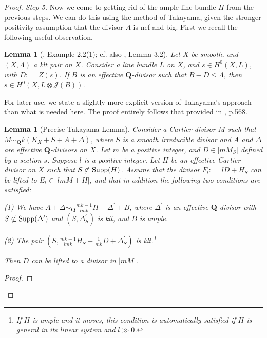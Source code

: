 \documentclass[11pt]{amsart}
\theoremstyle{plain}
\newtheorem{lemma}[theorem]{Lemma}
\theoremstyle{definition}
\newcommand{\noi}{\noindent}
\newcommand{\QQ}{\mathbf{Q}}
\newcommand{\JJ}{\mathcal  {J}}
\begin{document}
\begin{proof}
\noindent
\emph{Step 5.}
Now we come to getting rid of the ample line bundle $H$ from the previous steps. We can do this using the method of Takayama, given the stronger positivity assumption that the divisor $A$ is nef and big. First we recall the following useful observation.

\begin{lemma}[\cite{takayama}, Example 2.2(1); cf. also \cite{hm2}, Lemma 3.2]\label{local_inclusion}
Let $X$ be smooth, and $(X, \Lambda)$ a klt pair on $X$. Consider a line bundle $L$ on $X$, and $s \in H^0 (X, L)$, with $D : = Z(s)$. If $B$ is an effective $\QQ$-divisor  such that $B - D \leq \Lambda$, 
then $s \in H^0 (X, L \otimes \JJ(B))$. 
\end{lemma}

\noindent
For later use, we state a slightly more explicit version of Takayama's approach than what  is needed here. The proof entirely follows that provided in \cite{takayama}, p.568.

\begin{lemma}[Precise Takayama Lemma]\label{precise_takayama}
Consider a Cartier divisor $M$ such that $M \sim_{\QQ} k (K_X + S + A + \Delta)$, where $S$ 
is a smooth irreducible divisor and $A$ and $\Delta$ are effective $\QQ$-divisors on $X$.
Let $m$ be a positive integer, and $D\in |mM_S|$ defined by a section $s$.
Suppose $l$ is a positive integer. Let $H$ be an effective Cartier divisor on $X$ 
such that $S \not\subset {\rm Supp}(H)$. Assume that the
divisor $F_l : = lD+H_S$ can be lifted to $E_l \in |lmM+H|$, and that in addition the 
following two conditions are satisfied:

\noi
(1) We have $A + \Delta \sim_{\QQ} \frac{mk-1}{lmk} H + \Delta^\prime + B$, 
where $\Delta^\prime$ is an effective $\QQ$-divisor with $S \not\subset {\rm Supp}(\Delta^\prime)$ and 
$(S, \Delta^\prime_S)$ is klt,  and $B$ is ample.

\noi
(2) The pair $(S, \frac{mk-1}{lmk} H_S -\frac{1}{mk}D + \Delta^{\prime}_S)$ is klt.\footnote{If $H$ is ample and it moves, this condition is automatically satisfied if $H$ is general in its linear system and $l\gg0$.}  

\noi
Then $D$ can be lifted to a divisor in $|mM|$. 
\end{lemma}
\begin{proof} 


\end{proof}
\end{proof}
\end{document}
